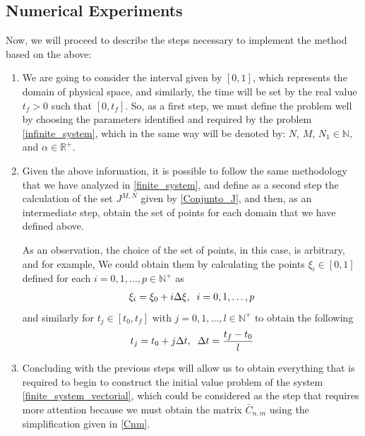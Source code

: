 \subsection{Numerical Experiments}
    
    Now, we will proceed to describe the steps necessary to implement the method based on the above:
    \begin{enumerate}
    	\item We are going to consider the interval given by $[0, 1]$, which represents the domain of physical space, and similarly, the time will be set by the real value $t_f>0$ such that $[0, t_f]$. So, as a first step, we must define the problem well by choosing the parameters identified and required by the problem \ref{infinite_system}, which in the same way will be denoted by: $N$, $M$, $N_1 \in \mathbb{N}$, and $\alpha \in \mathbb{R}^+$.
    	
    	\item Given the above information, it is possible to follow the same methodology that we have analyzed in \ref{finite_system}, and define as a second step the calculation of the set $J^{M, N}$ given by \ref{Conjunto_J}, and then, as an intermediate step, obtain the set of points for each domain that we have defined above. 
    	
    	As an observation, the choice of the set of points, in this case, is arbitrary, and for example, We could obtain them by calculating the points $\xi_i \in [0, 1]$ defined for each $i = 0, 1, \dots, p \in \mathbb{N}^+$ as
    	\begin{align*}
    		\xi_i = \xi_0 + i \Delta \xi, \hspace{2mm} i = 0, 1, \dots, p
    	\end{align*}
    	and similarly for $t_j \in [t_0, t_f]$ with $j = 0, 1, \dots, l \in \mathbb{N}^+$ to obtain the following
    	\begin{align*}
    		t_j = t_0 + j \Delta t, \hspace{2mm} \Delta t = \frac{t_f - t_0}{l} 
    	\end{align*}
    	
    	\item Concluding with the previous steps will allow us to obtain everything that is required to begin to construct the initial value problem of the system \ref{finite_system_vectorial}, which could be considered as the step that requires more attention because we must obtain the matrix $\bar{C}_{n, m}$ using the simplification given in \ref{Cnm}. 
    	

\end{enumerate}
